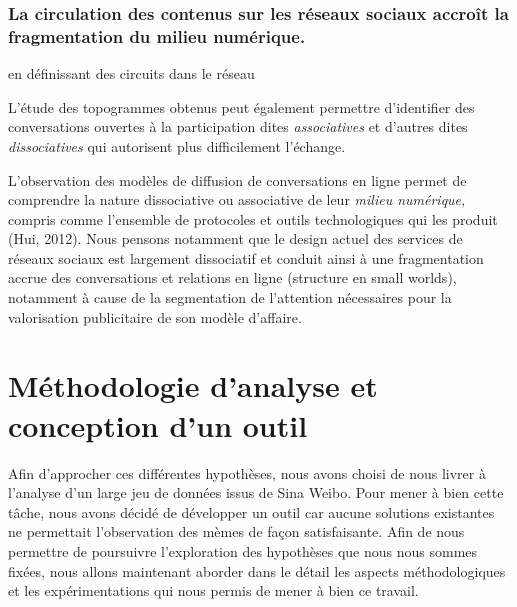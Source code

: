 \subsubsection{La circulation des contenus sur les réseaux sociaux accroît la fragmentation du milieu numérique.}

en définissant des circuits dans le réseau

L'étude des topogrammes obtenus peut également permettre d'identifier des conversations ouvertes à la participation dites \textit{associatives }et d{\textquoteright}autres dites \textit{dissociatives} qui autorisent plus difficilement l{\textquoteright}échange. 

L{\textquoteright}observation des modèles de diffusion de conversations en ligne permet de comprendre la nature dissociative ou associative de leur \textit{milieu numérique, }compris comme l{\textquoteright}ensemble de protocoles et outils technologiques qui les produit (Hui, 2012). Nous pensons notamment que le design actuel des services de réseaux sociaux est largement dissociatif et conduit ainsi à une fragmentation accrue des conversations et relations en ligne (structure en small worlds), notamment à cause de la segmentation de l{\textquoteright}attention nécessaires pour la valorisation publicitaire de son modèle d{\textquoteright}affaire.  


\section*{Méthodologie d'analyse et conception d'un outil} 

Afin d{\textquoteright}approcher ces différentes hypothèses, nous avons choisi de nous livrer à l'analyse d'un large jeu de données issus de Sina Weibo. Pour mener à bien cette tâche, nous avons décidé de développer un outil car aucune solutions existantes ne permettait l'observation des mèmes de façon satisfaisante. Afin de nous permettre de poursuivre l'exploration des hypothèses que nous nous sommes fixées, nous allons maintenant aborder dans le détail les aspects méthodologiques et les expérimentations qui nous permis de mener à bien ce travail.